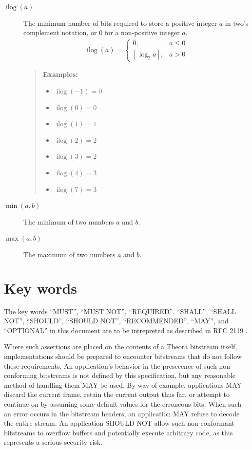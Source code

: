 \documentclass[11pt,letterpaper]{book}
\newcommand{\ilog}{\ensuremath{\mathop{\mathrm{ilog}}\nolimits}}
\numberwithin{equation}{chapter}
\numberwithin{figure}{chapter}
\numberwithin{table}{chapter}
\begin{document}
\begin{description}
\item[$\ilog(a)$]
The minimum number of bits required to store a positive integer $a$ in
 two's complement notation, or $0$ for a non-positive integer $a$.
\begin{align*}
\ilog(a) = \left\{\begin{array}{ll}
0, & a \le 0 \\
\left\lceil\log_2{a}\right\rceil, & a > 0
\end{array}\right.
\end{align*}

\begin{verse}
{\bf Examples:}
\begin{itemize}
\item $\ilog(-1)=0$
\item $\ilog(0)=0$
\item $\ilog(1)=1$
\item $\ilog(2)=2$
\item $\ilog(3)=2$
\item $\ilog(4)=3$
\item $\ilog(7)=3$
\end{itemize}
\end{verse}

\item[$\min(a,b)$]
The minimum of two numbers $a$ and $b$.

\item[$\max(a,b)$]
The maximum of two numbers $a$ and $b$.

\end{description}
\cleardoublepage


\thispagestyle{plain}
\chapter*{Key words}

\setlength{\emergencystretch}{2em}
The key words ``MUST'', ``MUST NOT'', ``REQUIRED'', ``SHALL'', ``SHALL NOT'',
 ``SHOULD'', ``SHOULD NOT'', ``RECOMMENDED'', ``MAY'', and ``OPTIONAL'' in this
 document are to be intrepreted as described in RFC 2119 \cite{rfc2119}.\par
\setlength{\emergencystretch}{0em}

Where such assertions are placed on the contents of a Theora bitstream itself,
 implementations should be prepared to encounter bitstreams that do not follow
 these requirements.
An application's behavior in the presecence of such non-conforming bitstreams
 is not defined by this specification, but any reasonable method of handling 
 them MAY be used.
By way of example, applications MAY discard the current frame, retain the
 current output thus far, or attempt to continue on by assuming some default
 values for the erroneous bits.
When such an error occurs in the bitstream headers, an application MAY refuse
 to decode the entire stream.
An application SHOULD NOT allow such non-conformant bitstreams to overflow
 buffers and potentially execute arbitrary code, as this represents a serious
 security risk.
\end{document}
